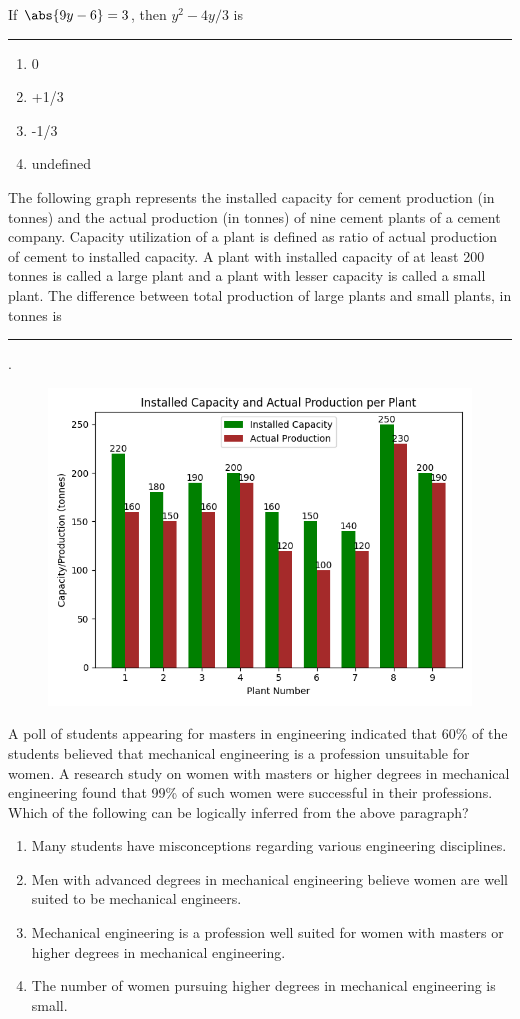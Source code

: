 \item If $\abs{9y - 6} = 3$, then $y^2 - 4y/3$ is \rule{1cm}{0.15mm}
\begin{multicols}{2}
    \begin{enumerate}
        \item 0
        \item +1/3
        \item -1/3
        \item undefined
    \end{enumerate}
\end{multicols}

\item The following graph represents the installed capacity for cement production (in tonnes) and the
actual production (in tonnes) of nine cement plants of a cement company. Capacity utilization of a
plant is defined as ratio of actual production of cement to installed capacity. A plant with installed
capacity of at least 200 tonnes is called a large plant and a plant with lesser capacity is called a
small plant. The difference between total production of large plants and small plants, in tonnes is \rule{1cm}{0.15mm}.
\begin{figure}
    \centering
    \includegraphics[width=0.5\linewidth]{GATE-yearwise/2016/S1/figs/figure.png}
    \label{fig:enter-label}
\end{figure}

\item A poll of students appearing for masters in engineering indicated that 60\% of the students believed that mechanical engineering is a profession unsuitable for women. A research study on women with
masters or higher degrees in mechanical engineering found that 99\% of such women were successful in their professions.\\
Which of the following can be logically inferred from the above paragraph?
\begin{enumerate}
    \item Many students have misconceptions regarding various engineering disciplines.
    \item Men with advanced degrees in mechanical engineering believe women are well suited to be mechanical engineers.
    \item Mechanical engineering is a profession well suited for women with masters or higher degrees in mechanical engineering.
    \item The number of women pursuing higher degrees in mechanical engineering is small.
\end{enumerate}

